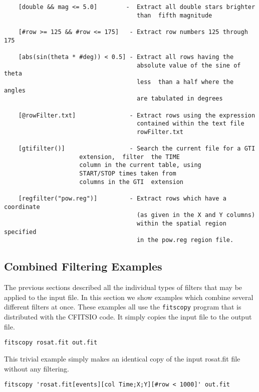 \documentclass[11pt]{article}
\begin{document}
\begin{verbatim}
    [double && mag <= 5.0]        -  Extract all double stars brighter
                                     than  fifth magnitude 

    [#row >= 125 && #row <= 175]   - Extract row numbers 125 through 175

    [abs(sin(theta * #deg)) < 0.5] - Extract all rows having the
                                     absolute value of the sine of theta
                                     less  than a half where the angles
                                     are tabulated in degrees

    [@rowFilter.txt]               - Extract rows using the expression
                                     contained within the text file
                                     rowFilter.txt

    [gtifilter()]                  - Search the current file for a GTI
				     extension,  filter  the TIME
				     column in the current table, using
				     START/STOP times taken from
				     columns in the GTI  extension

    [regfilter("pow.reg")]         - Extract rows which have a coordinate
                                     (as given in the X and Y columns)
                                     within the spatial region specified
                                     in the pow.reg region file.
\end{verbatim}

\newpage
\subsection{Combined Filtering Examples}

The previous sections described all the individual types of filters
that may be applied to the input file.  In this section we show
examples which combine several different filters at once.  These
examples all use the {\tt fitscopy} program that is distributed with
the CFITSIO code.  It simply copies the input file to the output file.

\begin{verbatim}
fitscopy rosat.fit out.fit
\end{verbatim}

This trivial example simply makes an identical copy of the input
rosat.fit file without any filtering.

\begin{verbatim}
fitscopy 'rosat.fit[events][col Time;X;Y][#row < 1000]' out.fit
\end{verbatim}
\end{document}
